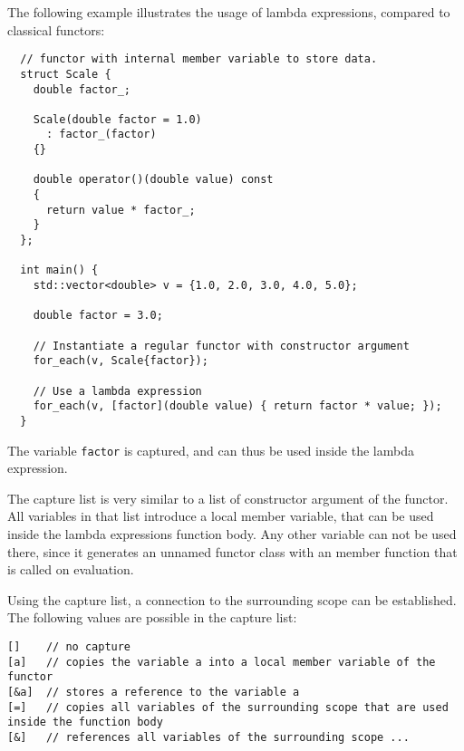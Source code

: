 \begin{example}
  The following example illustrates the usage of lambda expressions, compared to classical functors:
  \begin{verbatim}
  // functor with internal member variable to store data.
  struct Scale {
    double factor_;

    Scale(double factor = 1.0)
      : factor_(factor)
    {}

    double operator()(double value) const
    {
      return value * factor_;
    }
  };

  int main() {
    std::vector<double> v = {1.0, 2.0, 3.0, 4.0, 5.0};

    double factor = 3.0;

    // Instantiate a regular functor with constructor argument
    for_each(v, Scale{factor});

    // Use a lambda expression
    for_each(v, [factor](double value) { return factor * value; });
  }
  \end{verbatim}
  The variable \texttt{factor} is captured, and can thus be used inside the lambda expression.
\end{example}

The capture list is very similar to a list of constructor argument of the functor. All variables in that list introduce a local
member variable, that can be used inside the lambda expressions function body. Any other variable can not be used there, since it
generates an unnamed functor class with an  member function that is called on evaluation.

Using the capture list, a connection to the surrounding scope can be established. The following values are possible in the capture list:
\begin{verbatim}
[]    // no capture
[a]   // copies the variable a into a local member variable of the functor
[&a]  // stores a reference to the variable a
[=]   // copies all variables of the surrounding scope that are used inside the function body
[&]   // references all variables of the surrounding scope ...
\end{verbatim}


